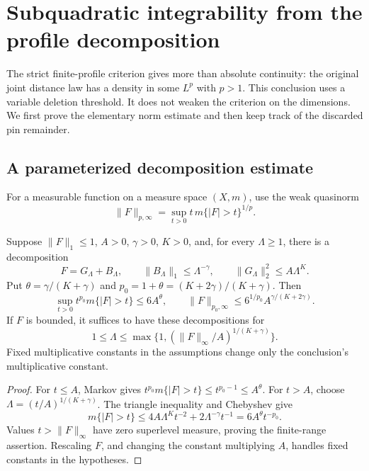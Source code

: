 \section{Subquadratic integrability from the profile decomposition}
\label{subquad:section}

The strict finite-profile criterion gives more than absolute continuity:
the original joint distance law has a density in some \(L^p\) with
\(p>1\). This conclusion uses a variable deletion threshold. It does not
weaken the criterion on the dimensions. We first prove the elementary
norm estimate and then keep track of the discarded pin remainder.

\subsection{A parameterized decomposition estimate}
For a measurable function on a measure space \((X,m)\), use the weak
quasinorm
\[
 \|F\|_{p,\infty}=\sup_{t>0}t\,m\{|F|>t\}^{1/p}.
\]
\begin{lemma}\label{subquad:interpolation}
Suppose \(\|F\|_1\le1\), \(A>0\), \(\gamma>0\), \(K>0\), and,
for every \(\Lambda\ge1\), there is a decomposition
\[
 F=G_\Lambda+B_\Lambda,\qquad
 \|B_\Lambda\|_1\le\Lambda^{-\gamma},\qquad
 \|G_\Lambda\|_2^2\le A\Lambda^K.
\]
Put \(\theta=\gamma/(K+\gamma)\) and
\(p_0=1+\theta=(K+2\gamma)/(K+\gamma)\). Then
\begin{equation}\label{subquad:weak}
 \sup_{t>0}t^{p_0}m\{|F|>t\}\le6A^\theta,
 \qquad
 \|F\|_{p_0,\infty}\le6^{1/p_0}A^{\gamma/(K+2\gamma)}.
\end{equation}
If \(F\) is bounded, it suffices to have these decompositions for
\[
 1\le\Lambda\le\max\{1,(\|F\|_\infty/A)^{1/(K+\gamma)}\}.
\]
Fixed multiplicative constants in the assumptions change only the
conclusion's multiplicative constant.
\end{lemma}
\begin{proof}
For \(t\le A\), Markov gives
\(t^{p_0}m\{|F|>t\}\le t^{p_0-1}\le A^\theta\).
For \(t>A\), choose \(\Lambda=(t/A)^{1/(K+\gamma)}\). The triangle
inequality and Chebyshev give
\[
 m\{|F|>t\}\le4A\Lambda^Kt^{-2}+2\Lambda^{-\gamma}t^{-1}
 =6A^\theta t^{-p_0}.
\]
Values \(t>\|F\|_\infty\) have zero superlevel measure, proving the
finite-range assertion. Rescaling \(F\), and changing the constant
multiplying \(A\), handles fixed constants in the hypotheses.
\end{proof}

